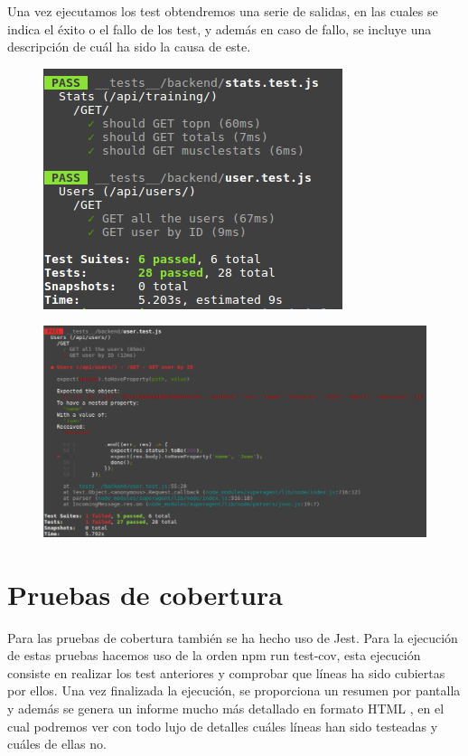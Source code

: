 Una vez ejecutamos los test obtendremos una serie de salidas, en las cuales se indica el éxito o el fallo de los test, y además en caso de fallo, se incluye una descripción de cuál ha sido la causa de este.
\begin{figure}
  \begin{center}
    \includegraphics[width=\textwidth]{imagenes/test_pass.png}
    \caption{}
    \label{fig:}
  \end{center}
\end{figure}
\begin{figure}
  \begin{center}
    \includegraphics[width=\textwidth]{imagenes/test_fail.png}
    \caption{}
    \label{fig:}
  \end{center}
\end{figure}
\section {Pruebas de cobertura}
Para las pruebas de cobertura también se ha hecho uso de Jest. Para la ejecución de estas pruebas hacemos uso de la orden npm run test-cov, esta ejecución consiste en realizar los test anteriores y comprobar que líneas ha sido cubiertas por ellos. Una vez finalizada la ejecución, se proporciona un resumen por pantalla y además se genera un informe mucho más detallado en formato HTML , en el cual podremos ver con todo lujo de detalles cuáles líneas han sido testeadas y cuáles de ellas no.

